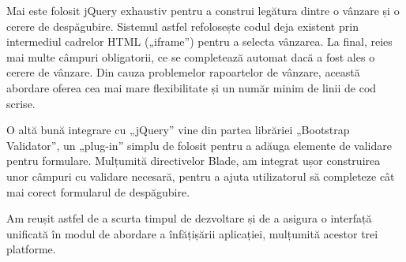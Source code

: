 	Mai este folosit jQuery exhaustiv pentru a construi legătura dintre o vânzare și o cerere de despăgubire.
	Sistemul astfel refolosește codul deja existent prin intermediul cadrelor HTML („iframe”) pentru a selecta vânzarea.
	La final, reies mai multe câmpuri obligatorii, ce se completează automat dacă a fost ales o cerere de vânzare.
	Din cauza problemelor rapoartelor de vânzare, această abordare oferea cea mai mare flexibilitate și un număr minim de linii de cod scrise.

	O altă bună integrare cu „jQuery” vine din partea librăriei „Bootstrap Validator”, un „plug-in” simplu de folosit pentru a adăuga elemente de validare pentru formulare. \cite{boostrap_validator}
	Mulțumită directivelor Blade, am integrat ușor construirea unor câmpuri cu validare necesară, pentru a ajuta utilizatorul să completeze cât mai corect formularul de despăgubire.

	Am reușit astfel de a scurta timpul de dezvoltare și de a asigura o interfață unificată în modul de abordare a înfățișării aplicației, mulțumită acestor trei platforme.
